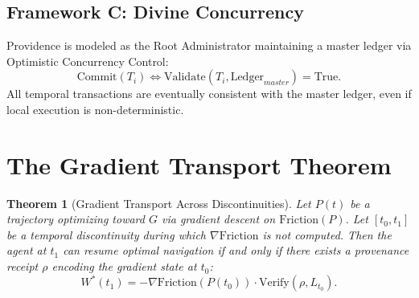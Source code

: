 \documentclass[12pt, a4paper]{article}
\theoremstyle{plain}
\newtheorem{theorem}{Theorem}[section]
\theoremstyle{definition}
\theoremstyle{remark}
\begin{document}
\subsection{Framework C: Divine Concurrency}

Providence is modeled as the Root Administrator maintaining a master ledger via Optimistic Concurrency Control:
\begin{equation}
    \text{Commit}(T_i) \iff \text{Validate}(T_i, \text{Ledger}_{master}) = \text{True}.
\end{equation}
All temporal transactions are eventually consistent with the master ledger, even if local execution is non-deterministic.

\section{The Gradient Transport Theorem}\label{sec:transport}

\begin{theorem}[Gradient Transport Across Discontinuities]\label{thm:transport}
Let $P(t)$ be a trajectory optimizing toward $G$ via gradient descent on $\text{Friction}(P)$. Let $[t_0, t_1]$ be a temporal discontinuity during which $\nabla \text{Friction}$ is not computed. Then the agent at $t_1$ can resume optimal navigation \emph{if and only if} there exists a provenance receipt $\rho$ encoding the gradient state at $t_0$:
\begin{equation}
    W^*(t_1) = -\nabla \text{Friction}(P(t_0)) \cdot \text{Verify}(\rho, L_{t_0}).
\end{equation}
\end{theorem}
\end{document}
